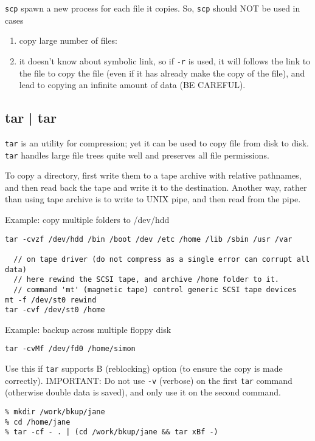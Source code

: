 \verb!scp! spawn a new process for each file it copies. So, \verb!scp! should
NOT be used in cases
\begin{enumerate}
  \item copy large number of files:
  \item it doesn't know about symbolic link, so if \verb!-r! is used, it will
  follows the link to the file to copy the file (even if it has already make
  the copy of the file), and lead to copying an infinite amount of data (BE
  CAREFUL).
\end{enumerate}

\subsection{tar | tar}

\verb!tar! is an utility for compression; yet it can be used to copy file from
disk to disk. \verb!tar! handles large file trees quite well and preserves all
file permissions.

To copy a directory, first write them to a tape archive with
relative pathnames, and then read back the tape and write it to the destination.
Another way, rather than using tape archive is to write to UNIX pipe, and then
read from the pipe.

Example: copy multiple folders to /dev/hdd

{\tiny
\begin{verbatim}
tar -cvzf /dev/hdd /bin /boot /dev /etc /home /lib /sbin /usr /var

  // on tape driver (do not compress as a single error can corrupt all data)
  // here rewind the SCSI tape, and archive /home folder to it.
  // command 'mt' (magnetic tape) control generic SCSI tape devices
mt -f /dev/st0 rewind
tar -cvf /dev/st0 /home  
\end{verbatim}
}

Example: backup across multiple floppy disk
\begin{verbatim}
tar -cvMf /dev/fd0 /home/simon
\end{verbatim}

Use this if \verb!tar! supports B (reblocking) option (to ensure the copy is
made correctly). IMPORTANT: Do not use \verb!-v! (verbose) on the first
\verb!tar! command (otherwise double data is saved), and only use it on the
second command.
{\tiny
\begin{verbatim}
% mkdir /work/bkup/jane
% cd /home/jane
% tar -cf - . | (cd /work/bkup/jane && tar xBf -)
\end{verbatim}
}


